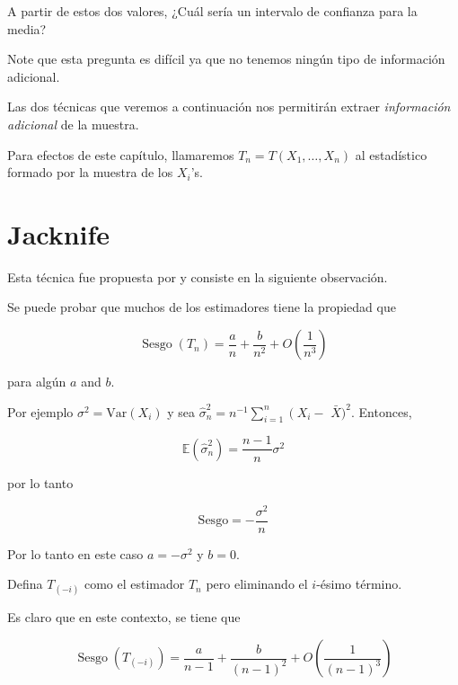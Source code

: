 \documentclass[
  12pt,
]{book}
\theoremstyle{definition}
\theoremstyle{definition}
\theoremstyle{definition}
\theoremstyle{remark}
\let\BeginKnitrBlock\begin \let\EndKnitrBlock\end
\begin{document}
A partir de estos dos valores, ¿Cuál sería un intervalo de confianza
para la media?

Note que esta pregunta es difícil ya que no tenemos ningún tipo de
información adicional.

Las dos técnicas que veremos a continuación nos permitirán extraer
\emph{información adicional} de la muestra.

\BeginKnitrBlock{remark}
{}Para efectos de este capítulo, llamaremos \(T_{n}=T\left(  X_{1},\ldots,X_{n}\right)\) al estadístico formado por la muestra de
los \(X_{i}\)'s.
\EndKnitrBlock{remark}

\hypertarget{jacknife}{%
\section{Jacknife}\label{jacknife}}

Esta técnica fue propuesta por \cite{Quenouille1949} y consiste en la
siguiente observación.

Se puede probar que muchos de los estimadores tiene la propiedad que

\begin{equation}
\operatorname{Sesgo}\left(T_{n}\right)=\frac{a}{n}+\frac{b}{n^{2}}+O\left(\frac{1}{n^{3}}\right)
\end{equation}

para algún \(a\) and \(b\).

Por ejemplo \(\sigma^{2}=\mathrm{Var}\left(X_{i}\right)\) y sea
\(\widehat{\sigma}_{n}^{2}=n^{-1} \sum_{i=1}^{n}\left(X_{i}-\right.\)
\(\bar{X})^{2}\). Entonces,

\begin{equation*}
\mathbb{E}\left(\widehat{\sigma}_{n}^{2}\right)=
\frac{n-1}{n}\sigma^{2}
\end{equation*}

por lo tanto

\begin{equation*}
\mathrm{Sesgo} = -\frac{\sigma^{2}}{n}
\end{equation*}

Por lo tanto en este caso \(a=-\sigma^{2}\) y \(b=0\).

Defina \(T_{(-i)}\) como el estimador \(T_{n}\) pero eliminando el
\(i\)-ésimo término.

Es claro que en este contexto, se tiene que

\begin{equation}
\operatorname{Sesgo}\left(T_{(-i)}\right)=\frac{a}{n-1}+\frac{b}{(n-1)^{2}}+O\left(\frac{1}{(n-1)^{3}}\right)
\end{equation}
\end{document}
